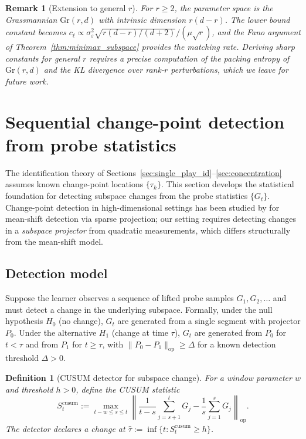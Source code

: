 \documentclass[12pt]{article}
\newcommand{\op}{\mathrm{op}}
\newtheorem{definition}{Definition}
\newtheorem{remark}{Remark}
\theoremstyle{plain}
\theoremstyle{definition}
\begin{document}
\begin{remark}[Extension to general $r$]
For $r \ge 2$, the parameter space is the Grassmannian $\mathrm{Gr}(r, d)$ with intrinsic dimension $r(d-r)$. The lower bound constant becomes $c_\ell \propto \sigma_\varepsilon^2 \sqrt{r(d-r)/(d+2)} / (\mu\sqrt{r})$, and the Fano argument of Theorem~\ref{thm:minimax_subspace} provides the matching rate. Deriving sharp constants for general $r$ requires a precise computation of the packing entropy of $\mathrm{Gr}(r,d)$ and the KL divergence over rank-$r$ perturbations, which we leave for future work.
\end{remark}


\section{Sequential change-point detection from probe statistics}
\label{sec:changepoint}

The identification theory of Sections~\ref{sec:single_play_id}--\ref{sec:concentration} assumes known change-point locations $\{\tau_k\}$. This section develops the statistical foundation for detecting subspace changes from the probe statistics $\{G_t\}$. Change-point detection in high-dimensional settings has been studied by \citet{wang2018high} for mean-shift detection via sparse projection; our setting requires detecting changes in a \emph{subspace projector} from quadratic measurements, which differs structurally from the mean-shift model.

\subsection{Detection model}

Suppose the learner observes a sequence of lifted probe samples $G_1, G_2, \ldots$ and must detect a change in the underlying subspace. Formally, under the null hypothesis $H_0$ (no change), $G_t$ are generated from a single segment with projector $P_0$. Under the alternative $H_1$ (change at time $\tau$), $G_t$ are generated from $P_0$ for $t < \tau$ and from $P_1$ for $t \ge \tau$, with $\|P_0 - P_1\|_{\op} \ge \Delta$ for a known detection threshold $\Delta > 0$.

\begin{definition}[CUSUM detector for subspace change]
\label{def:cusum}
For a window parameter $w$ and threshold $h > 0$, define the CUSUM statistic
\begin{equation}
S_t^{\mathrm{cusum}} := \max_{t - w \le s \le t} \left\|\frac{1}{t - s}\sum_{j=s+1}^t G_j - \frac{1}{s}\sum_{j=1}^s G_j\right\|_{\op}.
\label{eq:cusum}
\end{equation}
The detector declares a change at $\hat\tau := \inf\{t : S_t^{\mathrm{cusum}} \ge h\}$.
\end{definition}
\end{document}
